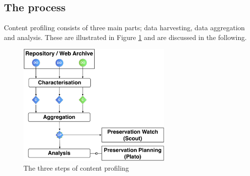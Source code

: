 \subsection{The process}
Content profiling consists of three main parts; data harvesting, data aggregation and analysis. These are illustrated in Figure \ref{fig:cp_threesteps} and are discussed in the following.

\begin{figure}[bh]
\begin{center}
\includegraphics[width=3in]{figures/contentprofiling/contentprofiling.png}
\caption{The three steps of content profiling}
\label{fig:cp_threesteps}
\end{center}
\end{figure}

